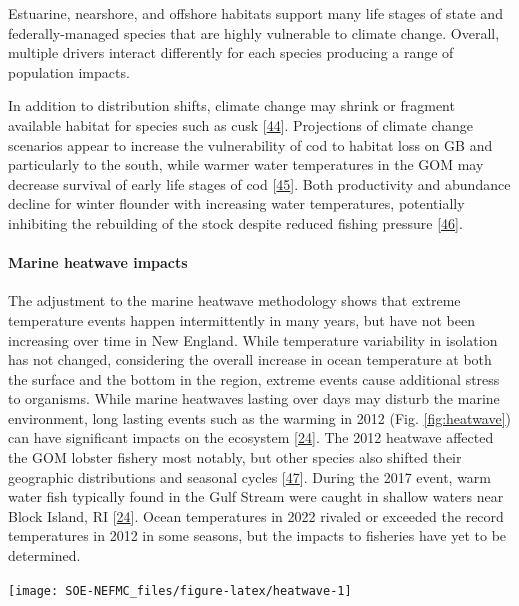 \documentclass[
  10pt,
]{article}
\let\origfigure\figure
\let\endorigfigure\endfigure
\renewenvironment{figure}[1][2] {
    \expandafter\origfigure\expandafter[H]
} {
    \endorigfigure
}
\begin{document}
Estuarine, nearshore, and offshore habitats support many life stages of state and federally-managed species that are highly vulnerable to climate change. Overall, multiple drivers interact differently for each species producing a range of population impacts.

In addition to distribution shifts, climate change may shrink or fragment available habitat for species such as cusk {[}\protect\hyperlink{ref-hare_cusk_2012}{44}{]}. Projections of climate change scenarios appear to increase the vulnerability of cod to habitat loss on GB and particularly to the south, while warmer water temperatures in the GOM may decrease survival of early life stages of cod {[}\protect\hyperlink{ref-fogarty_cod_2007}{45}{]}. Both productivity and abundance decline for winter flounder with increasing water temperatures, potentially inhibiting the rebuilding of the stock despite reduced fishing pressure {[}\protect\hyperlink{ref-bell_rebuilding_2014}{46}{]}.

\hypertarget{marine-heatwave-impacts}{%
\paragraph{Marine heatwave impacts}\label{marine-heatwave-impacts}}

The adjustment to the marine heatwave methodology shows that extreme temperature events happen intermittently in many years, but have not been increasing over time in New England. While temperature variability in isolation has not changed, considering the overall increase in ocean temperature at both the surface and the bottom in the region, extreme events cause additional stress to organisms. While marine heatwaves lasting over days may disturb the marine environment, long lasting events such as the warming in 2012 (Fig. \ref{fig:heatwave}) can have significant impacts on the ecosystem {[}\protect\hyperlink{ref-gawarkiewicz_characteristics_2019}{24}{]}. The 2012 heatwave affected the GOM lobster fishery most notably, but other species also shifted their geographic distributions and seasonal cycles {[}\protect\hyperlink{ref-mills_fisheries_2013}{47}{]}. During the 2017 event, warm water fish typically found in the Gulf Stream were caught in shallow waters near Block Island, RI {[}\protect\hyperlink{ref-gawarkiewicz_characteristics_2019}{24}{]}. Ocean temperatures in 2022 rivaled or exceeded the record temperatures in 2012 in some seasons, but the impacts to fisheries have yet to be determined.

\begin{figure}

{\centering \texttt{[image: SOE-NEFMC\_files/figure-latex/heatwave-1]} 

}

\caption{Marine heatwave maximum intesity (left) and total days each year (right) in the Gulf of Maine.}\label{fig:heatwave}
\end{figure}
\end{document}
